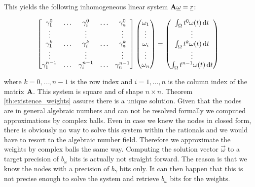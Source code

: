 \documentclass[a4paper,10pt]{article}
\begin{document}
This yields the following inhomogeneous linear system $\mathbf{A} \underline{\omega} = \underline{r}$:

\begin{equation}
  \label{eq:linsys_for_weights_matrix}
  \begin{bmatrix}
    \gamma_1^0     & \hdots & \gamma_i^0     & \hdots & \gamma_n^0 \\
    \vdots         & {}     & \vdots         & {}     & \vdots \\
    \gamma_1^k     & \hdots & \gamma_i^k     & \hdots & \gamma_n^k \\
    \vdots         & {}     & \vdots         & {}     & \vdots \\
    \gamma_1^{n-1} & \hdots & \gamma_i^{n-1} & \hdots & \gamma_n^{n-1}
  \end{bmatrix}
  \begin{pmatrix}
    \omega_1 \\
    \vdots \\
    \omega_i \\
    \vdots \\
    \omega_n
  \end{pmatrix}
  =
  \begin{pmatrix}
  \int_{\Omega} t^0 \omega(t) \,\mathrm{d}t \\
  \vdots \\
  \int_{\Omega} t^k \omega(t) \,\mathrm{d}t \\
  \vdots \\
  \int_{\Omega} t^{n-1} \omega(t) \,\mathrm{d}t
  \end{pmatrix}
\end{equation}

where $k = 0, \ldots, n-1$ is the row index and $i = 1, \ldots, n$
is the column index of the matrix $\mathbf{A}$. This system is square
and of shape $n \times n$. Theorem \ref{th:existence_weights} assures there is
a unique solution. Given that the nodes are in general algebraic numbers
and can not be resolved formally we computed approximations by complex
balls. Even in case we knew the nodes in closed form, there is obviously
no way to solve this system within the rationals and we would have to resort
to the algebraic number field. Therefore we approximate the weights by complex
balls the same way. Computing the solution vector $\vec{\omega}$ to a target
precision of $b_{\omega}$ bits is actually not straight forward. The reason is
that we know the nodes with a precision of $b_{\gamma}$ bits only. It can then
happen that this is not precise enough to solve the system and retrieve $b_{\omega}$
bits for the weights.
\end{document}

